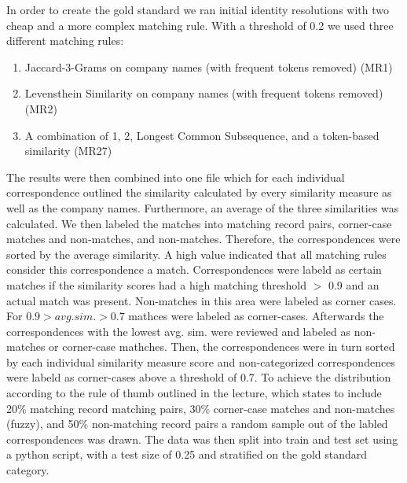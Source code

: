 \documentclass[11pt,titlepage,oneside,openany]{book}
\begin{document}
In order to create the gold standard we ran initial identity resolutions with two cheap and a more complex matching rule. With a threshold of 0.2 we used three different matching rules: \begin{enumerate}
	\item Jaccard-3-Grams on company names (with frequent tokens removed) (MR1)
	\item Levensthein Similarity on company names (with frequent tokens removed) (MR2)
	\item A combination of 1, 2, Longest Common Subsequence, and a token-based similarity (MR27)
\end{enumerate}
The results were then combined into one file which for each individual correspondence outlined the similarity calculated by every similarity measure as well as the company names. Furthermore, an average of the three similarities was calculated. We then labeled the matches into matching record pairs, corner-case matches and non-matches, and non-matches.
Therefore, the correspondences were sorted by the average similarity. A high value indicated that all matching rules consider this correspondence a match. Correspondences were labeld as certain matches if the similarity scores had a high matching threshold $>$ 0.9 and an actual match was present. Non-matches in this area were labeled as corner cases. For $0.9 > avg. sim. > 0.7$ mathces were labeled as corner-cases. Afterwards the correspondences with the lowest avg. sim. were reviewed and labeled as non-matches or corner-case mathches. Then, the correspondences were in turn sorted by each individual similarity measure score and non-categorized correspondences were labeld as corner-cases above a threshold of 0.7.
To achieve the distribution according to the rule of thumb outlined in the lecture, which states to include 20\% matching record matching pairs, 30\% corner-case matches and non-matches (fuzzy), and 50\% non-matching record pairs a random sample out of the labled correspondences was drawn.
The data was then split into train and test set using a python script, with a test size of 0.25 and stratified on the gold standard category.

\end{document}

